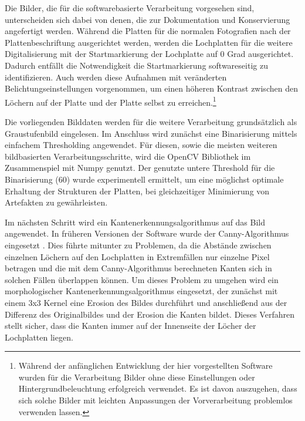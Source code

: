 Die Bilder, die für die softwarebasierte Verarbeitung vorgesehen sind, unterscheiden sich dabei von denen, die zur Dokumentation und Konservierung angefertigt werden.
Während die Platten für die normalen Fotografien nach der Plattenbeschriftung ausgerichtet werden, werden die Lochplatten für die weitere Digitalisierung mit der Startmarkierung der Lochplatte auf 0 Grad ausgerichtet.
Dadurch entfällt die Notwendigkeit die Startmarkierung softwareseitig zu identifizieren.
Auch werden diese Aufnahmen mit veränderten Belichtungseinstellungen vorgenommen, um einen höheren Kontrast zwischen den Löchern auf der Platte und der Platte selbst zu erreichen.\footnote{Während der anfänglichen Entwicklung der hier vorgestellten Software wurden für die Verarbeitung Bilder ohne diese Einstellungen oder Hintergrundbeleuchtung erfolgreich verwendet. Es ist davon auszugehen, dass sich solche Bilder mit leichten Anpassungen der Vorverarbeitung problemlos verwenden lassen.}

Die vorliegenden Bilddaten werden für die weitere Verarbeitung grundsätzlich als Graustufenbild eingelesen.
Im Anschluss wird zunächst eine Binarisierung mittels einfachem Thresholding angewendet.
Für diesen, sowie die meisten weiteren bildbasierten Verarbeitungsschritte, wird die OpenCV \parencite[]{opencv_library} Bibliothek im Zusammenspiel mit Numpy \parencite[]{harris2020array} genutzt.
Der genutzte untere Threshold für die Binarisierung (60) wurde experimentell ermittelt, um eine möglichst optimale Erhaltung der Strukturen der Platten, bei gleichzeitiger Minimierung von Artefakten zu gewährleisten.

Im nächsten Schritt wird ein Kantenerkennungsalgorithmus auf das Bild angewendet.
In früheren Versionen der Software wurde der Canny-Algorithmus eingesetzt \parencite[]{canny_1986}.
Dies führte mitunter zu Problemen, da die Abstände zwischen einzelnen Löchern auf den Lochplatten in Extremfällen nur einzelne Pixel betragen und die mit dem Canny-Algorithmus berechneten Kanten sich in solchen Fällen überlappen können.
Um dieses Problem zu umgehen wird ein morphologischer Kantenerkennungsalgorithmus eingesetzt, der zunächst mit einem 3x3 Kernel eine Erosion des Bildes durchführt und anschließend aus der Differenz des Originalbildes und der Erosion die Kanten bildet.
Dieses Verfahren stellt sicher, dass die Kanten immer auf der Innenseite der Löcher der Lochplatten liegen.

